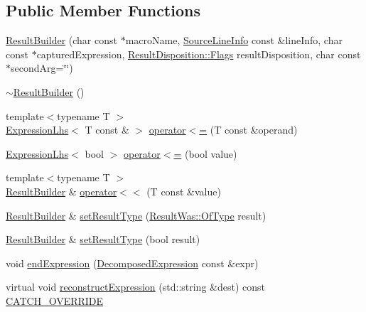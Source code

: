 \subsection*{Public Member Functions}
\begin{DoxyCompactItemize}
\item 
\hyperlink{classCatch_1_1ResultBuilder_a8579c3056f64f9324cf1181532828376}{Result\-Builder} (char const $\ast$macro\-Name, \hyperlink{structCatch_1_1SourceLineInfo}{Source\-Line\-Info} const \&line\-Info, char const $\ast$captured\-Expression, \hyperlink{structCatch_1_1ResultDisposition_a3396cad6e2259af326b3aae93e23e9d8}{Result\-Disposition\-::\-Flags} result\-Disposition, char const $\ast$second\-Arg=\char`\"{}\char`\"{})
\item 
\hyperlink{classCatch_1_1ResultBuilder_a687d1e9521d97f93c883ab070cc94c64}{$\sim$\-Result\-Builder} ()
\item 
{\footnotesize template$<$typename T $>$ }\\\hyperlink{classCatch_1_1ExpressionLhs}{Expression\-Lhs}$<$ T const \& $>$ \hyperlink{classCatch_1_1ResultBuilder_a1829db87e701758c4c520988883b25b5}{operator$<$=} (T const \&operand)
\item 
\hyperlink{classCatch_1_1ExpressionLhs}{Expression\-Lhs}$<$ bool $>$ \hyperlink{classCatch_1_1ResultBuilder_a3b87b20bcd1ef9e630880e59eeefba2a}{operator$<$=} (bool value)
\item 
{\footnotesize template$<$typename T $>$ }\\\hyperlink{classCatch_1_1ResultBuilder}{Result\-Builder} \& \hyperlink{classCatch_1_1ResultBuilder_a5aa79ce6160ab8cd800eb65bbd7a28a4}{operator$<$$<$} (T const \&value)
\item 
\hyperlink{classCatch_1_1ResultBuilder}{Result\-Builder} \& \hyperlink{classCatch_1_1ResultBuilder_af896e372db9d7fc90ddeceff3ad110d0}{set\-Result\-Type} (\hyperlink{structCatch_1_1ResultWas_a624e1ee3661fcf6094ceef1f654601ef}{Result\-Was\-::\-Of\-Type} result)
\item 
\hyperlink{classCatch_1_1ResultBuilder}{Result\-Builder} \& \hyperlink{classCatch_1_1ResultBuilder_ae504348b073d0360bfd5fc33347ec689}{set\-Result\-Type} (bool result)
\item 
void \hyperlink{classCatch_1_1ResultBuilder_a864e03b7300271de7cc44b9864463c5a}{end\-Expression} (\hyperlink{structCatch_1_1DecomposedExpression}{Decomposed\-Expression} const \&expr)
\item 
virtual void \hyperlink{classCatch_1_1ResultBuilder_a7d94b15cf04301a8617e7b16158b5d82}{reconstruct\-Expression} (std\-::string \&dest) const \hyperlink{catch_8hpp_a8ecdce4d3f57835f707915ae831eb847}{C\-A\-T\-C\-H\-\_\-\-O\-V\-E\-R\-R\-I\-D\-E}

\end{DoxyCompactItemize}
